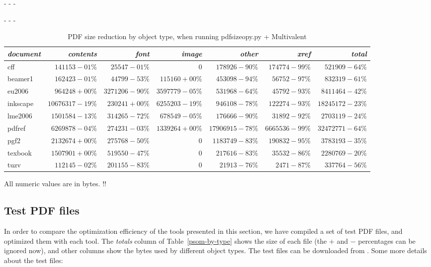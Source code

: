 \documentclass{ltugproc}
\def\cmd{\textsf}
\def\captiontop#1{%
  \advance\abovecaptionskip-\belowcaptionskip
  \advance\belowcaptionskip\abovecaptionskip
  \advance\abovecaptionskip-\belowcaptionskip
  \abovecaptionskip-\abovecaptionskip
  \caption{#1}%
  \advance\abovecaptionskip-\belowcaptionskip
  \advance\belowcaptionskip\abovecaptionskip
  \advance\abovecaptionskip-\belowcaptionskip
  \abovecaptionskip-\abovecaptionskip
}
\begin{document}
\begin{table*}
\captiontop{PDF size reduction by object type, when running
\cmd{pdfsizeopy.py} + Multivalent}\label{tab:psom-by-type}
\par\small\noindent\hfil
\begin{tabular}{@{}lrrrrrr@{}}
\toprule
\emph{document} & \emph{contents} & \emph{font} & \emph{image} & \emph{other} & \emph{xref} & \emph{total} \\\midrule
cff & $141153-01$\% & $25547-01$\% & 0 & $178926-90$\% & $174774-99$\% & $521909-64$\% \\
beamer1 & $162423-01$\% & $44799-53$\% & $115160+00$\% & $453098-94$\% & $56752-97$\% & $832319-61$\% \\
eu2006 & $964248+00$\% & $3271206-90$\% & $3597779-05$\% & $531968-64$\% & $45792-93$\% & $8411464-42$\% \\
inkscape & $10676317-19$\% & $230241+00$\% & $6255203-19$\% & $946108-78$\% & $122274-93$\% & $18245172-23$\% \\
lme2006 & $1501584-13$\% & $314265-72$\% & $678549-05$\% & $176666-90$\% & $31892-92$\% & $2703119-24$\% \\
pdfref & $6269878-04$\% & $274231-03$\% & $1339264+00$\% & $17906915-78$\% & $6665536-99$\% & $32472771-64$\% \\
pgf2 & $2132674+00$\% & $275768-50$\% & 0 & $1183749-83$\% & $190832-95$\% & $3783193-35$\% \\
texbook & $1507901+00$\% & $519550-47$\% & 0 & $217616-83$\% & $35532-86$\% & $2280769-20$\% \\
tuzv & $112145-02$\% & $201155-83$\% & 0 & $21913-76$\% & $2471-87$\% & $337764-56$\% \\
\bottomrule
\end{tabular}
\par\bigskip
\par\noindent All numeric values are in bytes. !!
\end{table*}

\subsection{Test PDF files}

In order to compare the optimization efficiency of the tools presented in
this section, we have compiled a set of test PDF files, and optimized them
with each tool. The \emph{totals} column of Table~\ref{psom-by-type} shows
the size of each file (the $+$ and $-$ percentages can be ignored now), and
other columns show the bytes used by different object types. The test files
can be downloaded from \cite{example-pdfs}. Some more
details about the test files:
\end{document}
